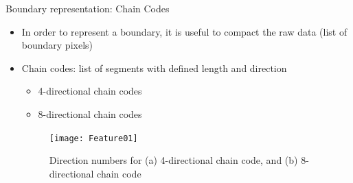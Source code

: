 \begin{frame}{Boundary representation: Chain Codes}
\begin{itemize}
\item In order to represent a boundary, it is useful to compact the raw data ({\color{mycolor2}list of boundary pixels})
\item {\color{mycolor1}Chain codes:} list of segments with defined length and direction
\begin{itemize}
\item 4-directional chain codes
\item 8-directional chain codes
\end{itemize}
\begin{figure}
\texttt{[image: Feature01]}
\caption{Direction numbers for (a) 4-directional chain code, and (b) 8-directional chain code}
\end{figure}
\end{itemize}
\end{frame}

